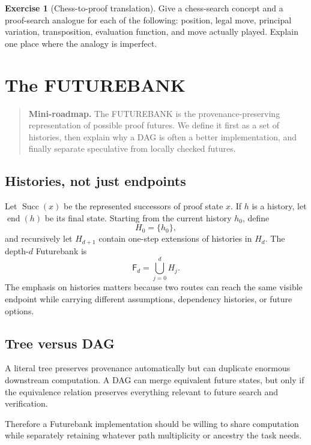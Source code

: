 \documentclass[11pt,openany]{book}
\theoremstyle{definition}
\newtheorem{exercise}[theorem]{Exercise}
\theoremstyle{remark}
\newenvironment{miniroadmap}{\begin{quote}\small\color{deepblue}\textbf{Mini-roadmap.} }{\end{quote}}
\newcommand{\Future}{\mathsf{F}}
\begin{document}
\begin{exercise}[Chess-to-proof translation]\label{ex:chess}
Give a chess-search concept and a proof-search analogue for each of the following: position, legal move, principal variation, transposition, evaluation function, and move actually played. Explain one place where the analogy is imperfect.
\end{exercise}

\chapter{The FUTUREBANK}
\begin{miniroadmap}
The FUTUREBANK is the provenance-preserving representation of possible proof futures. We define it first as a set of histories, then explain why a DAG is often a better implementation, and finally separate speculative from locally checked futures.
\end{miniroadmap}

\section{Histories, not just endpoints}
Let $\operatorname{Succ}(x)$ be the represented successors of proof state $x$. If $h$ is a history, let $\operatorname{end}(h)$ be its final state. Starting from the current history $h_0$, define
\[
H_0=\{h_0\},
\]
and recursively let $H_{d+1}$ contain one-step extensions of histories in $H_d$. The depth-$d$ Futurebank is
\[
\Future_d=\bigcup_{j=0}^{d}H_j.
\]
The emphasis on histories matters because two routes can reach the same visible endpoint while carrying different assumptions, dependency histories, or future options.

\section{Tree versus DAG}
A literal tree preserves provenance automatically but can duplicate enormous downstream computation. A DAG can merge equivalent future states, but only if the equivalence relation preserves everything relevant to future search and verification.

Therefore a Futurebank implementation should be willing to share computation while separately retaining whatever path multiplicity or ancestry the task needs.
\end{document}
